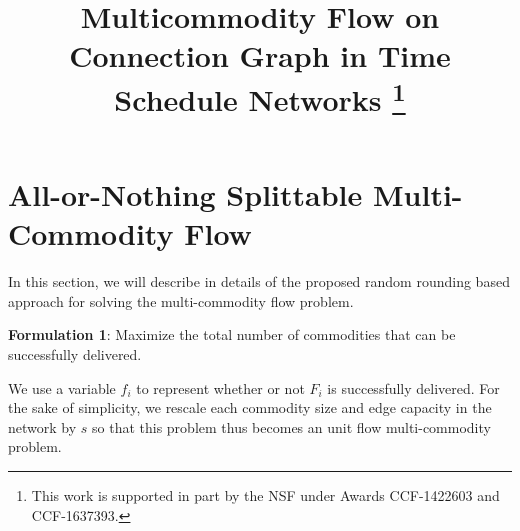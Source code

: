 \documentclass[conference]{IEEEtran}
\title{Multicommodity Flow on Connection Graph in Time Schedule Networks
\thanks{This work is supported in part by the NSF under Awards CCF-1422603 and CCF-1637393.}}
\begin{document}
\maketitle


\section{All-or-Nothing Splittable Multi-Commodity Flow} \label{sec:proposed}
In this section, we will describe in details of the proposed random rounding based approach for solving the multi-commodity flow problem. 


\textbf{Formulation 1}: Maximize the total number of commodities that can be successfully delivered.

We use a variable $f_i$ to represent whether or not $F_i$ is successfully delivered. For the sake of simplicity, we rescale each commodity size and edge capacity in the network by $s$ so that this problem thus becomes an unit flow multi-commodity problem.

\end{document}
